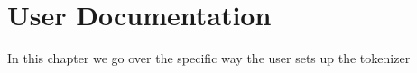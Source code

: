 \chapter{User Documentation}
\label{chap:userdoc}

In this chapter we go over the specific way the user sets up the tokenizer 
